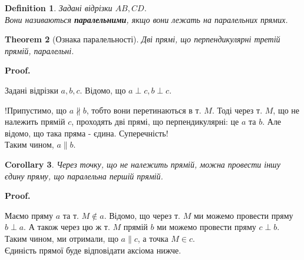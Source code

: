 \documentclass[a4paper, 10pt]{article}
\makeatletter
\def\qed{$\blacksquare$}
\theoremstyle{theoremdd}
\newtheorem{theorem}{Theorem}[subsection]
\theoremstyle{theoremdd}
\theoremstyle{theoremdd}
\newtheorem{definition}[theorem]{Definition}
\theoremstyle{theoremdd}
\theoremstyle{theoremdd}
\theoremstyle{theoremdd}
\theoremstyle{theoremdd}
\theoremstyle{theoremdd}
\theoremstyle{theoremdd}
\newtheorem{corollary}[theorem]{Corollary}
\renewenvironment{proof}[1][Proof.\\]{\par
\pushQED{\hfill \qed}%
\normalfont \topsep6\p@\@plus6\p@\relax
\trivlist
\item\relax
{\bfseries
#1\@addpunct{.}}\hspace\labelsep\ignorespaces
}{%
\popQED\endtrivlist\@endpefalse
}
\makeatother
\begin{document}
\begin{definition}
Задані відрізки $AB,CD$.\\
Вони називаються \textbf{паралельними}, якщо вони лежать на паралельних прямих.
\begin{figure}[H]
\centering
{}
\end{figure}
\end{definition}

\begin{theorem}[Ознака паралельності]
Дві прямі, що перпендикулярні третій прямій, паралельні.
\end{theorem}

\begin{proof}
Задані відрізки $a,b,c$. Відомо, що $a \perp c, b \perp c$.\\
\begin{figure}[H]
\centering
{}
\end{figure}
!Припустимо, що $a \not\parallel b$, тобто вони перетинаються в т. $M$. Тоді через т. $M$, що не належить прямій $c$, проходять дві прямі, що перпендикулярні: це $a$ та $b$. Але відомо, що така пряма - єдина. Суперечність!\\
Таким чином, $a \parallel b$.
\end{proof}

\begin{corollary}
Через точку, що не належить прямій, можна провести іншу єдину пряму, що паралельна першій прямій.
\end{corollary}

\begin{proof}
Маємо пряму $a$ та т. $M \not\in a$. Відомо, що через т. $M$ ми можемо провести пряму $b \perp a$. А також через цю ж т. $M$ прямій $b$ ми можемо провести пряму $c \perp b$.\\
Таким чином, ми отримали, що $a \parallel c$, а точка $M \in c$.\\
Єдиність прямої буде відповідати аксіома нижче.
\end{proof}
\end{document}
